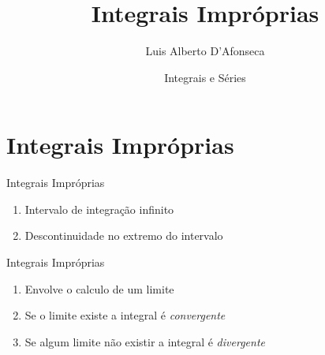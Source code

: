 
\usepackage{apresentacao}
\usepackage{mathconfig}
\usepackage{tabto}

\makeatletter
\graphicspath  {{./figs/}}
\makeatother

\newcommand{\fmedio}{f_{\text{médio}}}

\title {Integrais Impróprias}
\author{\large Luis Alberto D'Afonseca}
\date  {Integrais e Séries}



\begin{frame}
    \titlepage
\end{frame}

\section{Integrais Impróprias}

\begin{frame}{Integrais Impróprias}
\begin{enumerate}[<+->]
  \setlength\itemsep{1em}
  \item Intervalo de integração infinito
  \item Descontinuidade no extremo do intervalo
\end{enumerate}
\end{frame}

\begin{frame}{Integrais Impróprias}
\begin{enumerate}[<+->]
  \setlength\itemsep{1em}
  \item Envolve o calculo de um limite
  \item Se o limite existe a integral é \emph{convergente}
  \item Se algum limite não existir a integral é \emph{divergente}
\end{enumerate}
\end{frame}

